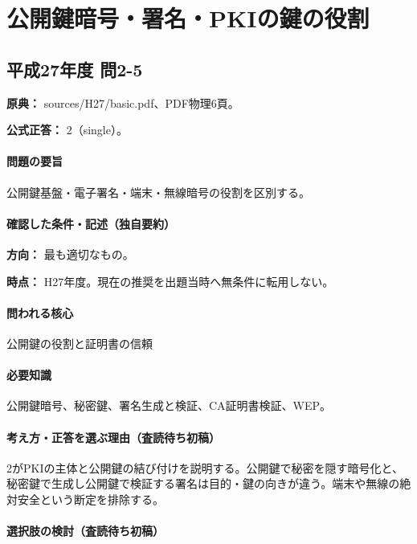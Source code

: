 \section{公開鍵暗号・署名・PKIの鍵の役割}

\subsection{平成27年度 問2-5}
\label{q:h27-reg-basic-2-5}

\noindent\textbf{原典：} sources/H27/basic.pdf、PDF物理6頁。

\textbf{公式正答：} 2（single）。

\paragraph{問題の要旨} 公開鍵基盤・電子署名・端末・無線暗号の役割を区別する。

\paragraph{確認した条件・記述（独自要約）}\mbox{}\par

\noindent\textbf{方向：} 最も適切なもの。\par

\noindent\textbf{時点：} H27年度。現在の推奨を出題当時へ無条件に転用しない。\par

\paragraph{問われる核心} 公開鍵の役割と証明書の信頼

\paragraph{必要知識} 公開鍵暗号、秘密鍵、署名生成と検証、CA証明書検証、WEP。

\paragraph{考え方・正答を選ぶ理由（査読待ち初稿）} 2がPKIの主体と公開鍵の結び付けを説明する。公開鍵で秘密を隠す暗号化と、秘密鍵で生成し公開鍵で検証する署名は目的・鍵の向きが違う。端末や無線の絶対安全という断定を排除する。

\paragraph{選択肢の検討（査読待ち初稿）}\mbox{}\par

